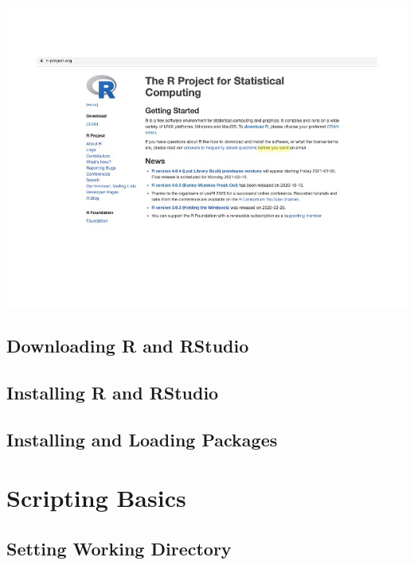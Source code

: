\documentclass[
]{book}
\begin{document}
\includegraphics{test1_files/figure-html/Rager_RIntro_Resources.jpg}

\hypertarget{downloading-r-and-rstudio}{%
\subsection{Downloading R and RStudio}\label{downloading-r-and-rstudio}}

\hypertarget{installing-r-and-rstudio}{%
\subsection{Installing R and RStudio}\label{installing-r-and-rstudio}}

\hypertarget{installing-and-loading-packages}{%
\subsection{Installing and Loading Packages}\label{installing-and-loading-packages}}

\hypertarget{scripting-basics}{%
\section{Scripting Basics}\label{scripting-basics}}

\hypertarget{setting-working-directory}{%
\subsection{Setting Working Directory}\label{setting-working-directory}}
\end{document}
